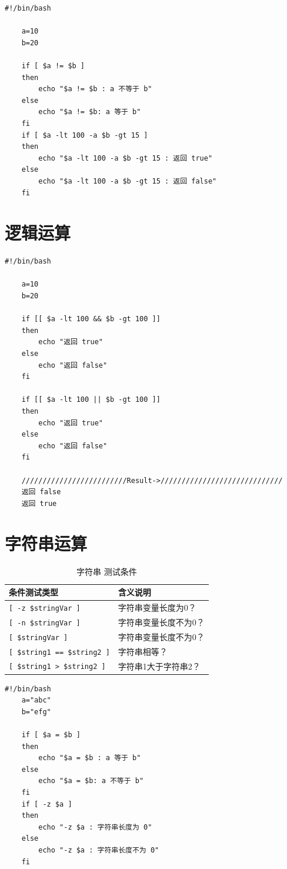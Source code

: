 \documentclass[UTF8,a4paper,12pt]{ctexbook}
\begin{document}
			 \begin{lstlisting}[xleftmargin=.06\textwidth]
	#!/bin/bash

	a=10
	b=20
	
	if [ $a != $b ]
	then
		echo "$a != $b : a 不等于 b"
	else
		echo "$a != $b: a 等于 b"
	fi
	if [ $a -lt 100 -a $b -gt 15 ]
	then
		echo "$a -lt 100 -a $b -gt 15 : 返回 true"
	else
		echo "$a -lt 100 -a $b -gt 15 : 返回 false"
	fi
			 \end{lstlisting}
		 \section{逻辑运算}
			 \begin{lstlisting}[xleftmargin=.06\textwidth]
	#!/bin/bash

	a=10
	b=20
	
	if [[ $a -lt 100 && $b -gt 100 ]]
	then
		echo "返回 true"
	else
		echo "返回 false"
	fi
	
	if [[ $a -lt 100 || $b -gt 100 ]]
	then
		echo "返回 true"
	else
		echo "返回 false"
	fi
	
	/////////////////////////Result->/////////////////////////////
	返回 false
	返回 true
			 \end{lstlisting}
		 \section{字符串运算}
		 	
			\begin{table}[H]
				\centering
				\caption{字符串 测试条件}
				\begin{tabular}{p{5cm}<{\centering} | p{10cm}<{\centering}}
					\toprule
						条件测试类型 & 含义说明\\
					\midrule
						\verb|[ -z $stringVar ]| &  字符串变量长度为0？ \\
						\verb|[ -n $stringVar ]| &  字符串变量长度不为0？\\
						\verb|[ $stringVar ]| &  字符串变量长度不为0？\\
						\verb|[ $string1 == $string2 ]| & 字符串相等？  \\	
						\verb|[ $string1 > $string2 ]| & 字符串1大于字符串2？  \\
					\bottomrule
				\end{tabular}
			\end{table}
			 \begin{lstlisting}[xleftmargin=.06\textwidth]
	#!/bin/bash
	a="abc"
	b="efg"
	
	if [ $a = $b ]
	then
		echo "$a = $b : a 等于 b"
	else
		echo "$a = $b: a 不等于 b"
	fi
	if [ -z $a ]
	then
		echo "-z $a : 字符串长度为 0"
	else
		echo "-z $a : 字符串长度不为 0"
	fi
			 \end{lstlisting}
			 
\end{document}
